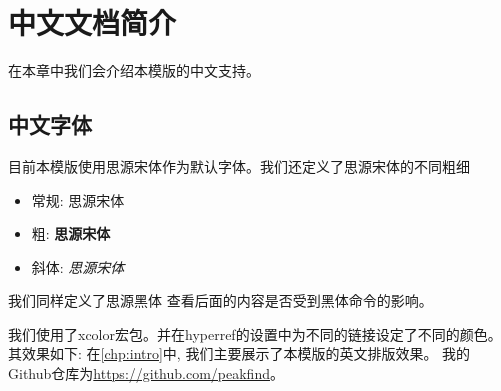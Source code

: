 \documentclass{mythesis}
\begin{document}
\chapter{中文文档简介}

在本章中我们会介绍本模版的中文支持。

\section{中文字体}

目前本模版使用思源宋体作为默认字体。我们还定义了思源宋体的不同粗细
\begin{itemize}
    \item 常规: 思源宋体 
    \item 粗: \textbf{思源宋体}
    \item 斜体: \textit{思源宋体}
\end{itemize}

我们同样定义了{\heiti 思源黑体} 查看后面的内容是否受到黑体命令的影响。

我们使用了xcolor宏包。并在hyperref的设置中为不同的链接设定了不同的颜色。其效果如下:
在\autoref{chp:intro}中, 我们主要展示了本模版的英文排版效果。 我的Github仓库为\url{https://github.com/peakfind}。
\end{document}
